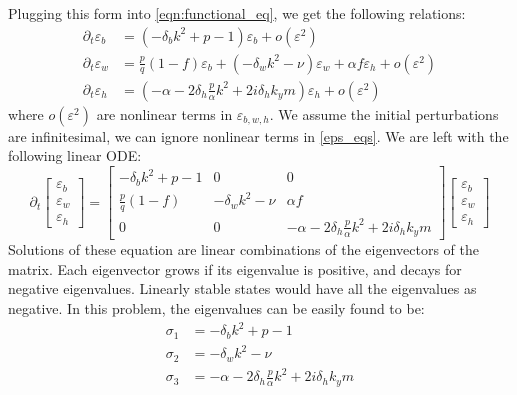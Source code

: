 \documentclass{article}
\numberwithin{equation}{section}
\begin{document}
Plugging this form into \ref{eqn:functional_eq}, we get the following relations:
\begin{align}\label{eps_eqs}
    \partial_t \varepsilon_b & = (-\delta_b k^2+p - 1)\varepsilon_b + o(\varepsilon^2)                                                     \\
    \partial_t \varepsilon_w & = \frac{p}{q}(1-f)\varepsilon_b + (-\delta_wk^2-\nu)\varepsilon_w +\alpha f\varepsilon_h + o(\varepsilon^2) \\
    \partial_t \varepsilon_h & = (-\alpha -2\delta_h \frac{p}{\alpha} k^2 +2i\delta_hk_ym) \varepsilon_h + o(\varepsilon^2)
\end{align}
where $o(\varepsilon^2)$ are nonlinear terms in $\varepsilon_{b,w,h}$. We assume the initial perturbations are infinitesimal, we can ignore nonlinear terms in \ref{eps_eqs}. We are left with the following linear ODE:
\begin{equation}
    \partial_t \begin{bmatrix}
        \varepsilon_b \\ \varepsilon_w \\ \varepsilon_h
    \end{bmatrix} = \begin{bmatrix}
        -\delta_b k^2+p - 1 & 0                & 0                                                       \\
        \frac{p}{q}(1-f)    & -\delta_wk^2-\nu & \alpha f                                                \\
        0                   & 0                & -\alpha -2\delta_h \frac{p}{\alpha} k^2 +2i\delta_hk_ym
    \end{bmatrix} \begin{bmatrix}
        \varepsilon_b \\ \varepsilon_w \\ \varepsilon_h
    \end{bmatrix}
\end{equation}
Solutions of these equation are linear combinations of the eigenvectors of the matrix. Each eigenvector grows if its eigenvalue is positive, and decays for negative eigenvalues. Linearly stable states would have all the eigenvalues as  negative. In this problem, the eigenvalues can be easily found to be:
\begin{align}
    \sigma_1 & = -\delta_b k^2+p - 1 \label{eq:sigma1}                   \\
    \sigma_2 & = -\delta_w k^2 -\nu                                      \\
    \sigma_3 & = -\alpha -2\delta_h \frac{p}{\alpha} k^2 +2i\delta_hk_ym
\end{align}
\end{document}
